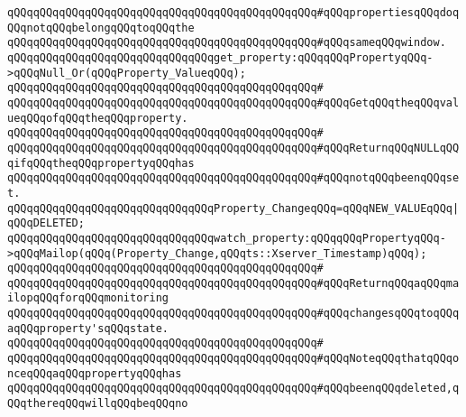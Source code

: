 \verb|qQQqqQQqqQQqqQQqqQQqqQQqqQQqqQQqqQQqqQQqqQQqqQQq#qQQqpropertiesqQQqdoqQQqnotqQQqbelongqQQqtoqQQqthe|\newline
\verb|qQQqqQQqqQQqqQQqqQQqqQQqqQQqqQQqqQQqqQQqqQQqqQQq#qQQqsameqQQqwindow.|\newline
\newline
\newline
\newline
\verb|qQQqqQQqqQQqqQQqqQQqqQQqqQQqqQQqget_property:qQQqqQQqPropertyqQQq->qQQqNull_Or(qQQqProperty_ValueqQQq);|\newline
\verb|qQQqqQQqqQQqqQQqqQQqqQQqqQQqqQQqqQQqqQQqqQQqqQQq#|\newline
\verb|qQQqqQQqqQQqqQQqqQQqqQQqqQQqqQQqqQQqqQQqqQQqqQQq#qQQqGetqQQqtheqQQqvalueqQQqofqQQqtheqQQqproperty.|\newline
\verb|qQQqqQQqqQQqqQQqqQQqqQQqqQQqqQQqqQQqqQQqqQQqqQQq#|\newline
\verb|qQQqqQQqqQQqqQQqqQQqqQQqqQQqqQQqqQQqqQQqqQQqqQQq#qQQqReturnqQQqNULLqQQqifqQQqtheqQQqpropertyqQQqhas|\newline
\verb|qQQqqQQqqQQqqQQqqQQqqQQqqQQqqQQqqQQqqQQqqQQqqQQq#qQQqnotqQQqbeenqQQqset.|\newline
\newline
\newline
\newline
\verb|qQQqqQQqqQQqqQQqqQQqqQQqqQQqqQQqProperty_ChangeqQQq=qQQqNEW_VALUEqQQq|\verb#|qQQqDELETED;#\newline
\newline
\newline
\verb|qQQqqQQqqQQqqQQqqQQqqQQqqQQqqQQqwatch_property:qQQqqQQqPropertyqQQq->qQQqMailop(qQQq(Property_Change,qQQqts::Xserver_Timestamp)qQQq);|\newline
\verb|qQQqqQQqqQQqqQQqqQQqqQQqqQQqqQQqqQQqqQQqqQQqqQQq#|\newline
\verb|qQQqqQQqqQQqqQQqqQQqqQQqqQQqqQQqqQQqqQQqqQQqqQQq#qQQqReturnqQQqaqQQqmailopqQQqforqQQqmonitoring|\newline
\verb|qQQqqQQqqQQqqQQqqQQqqQQqqQQqqQQqqQQqqQQqqQQqqQQq#qQQqchangesqQQqtoqQQqaqQQqproperty'sqQQqstate.|\newline
\verb|qQQqqQQqqQQqqQQqqQQqqQQqqQQqqQQqqQQqqQQqqQQqqQQq#|\newline
\verb|qQQqqQQqqQQqqQQqqQQqqQQqqQQqqQQqqQQqqQQqqQQqqQQq#qQQqNoteqQQqthatqQQqonceqQQqaqQQqpropertyqQQqhas|\newline
\verb|qQQqqQQqqQQqqQQqqQQqqQQqqQQqqQQqqQQqqQQqqQQqqQQq#qQQqbeenqQQqdeleted,qQQqthereqQQqwillqQQqbeqQQqno|\newline
